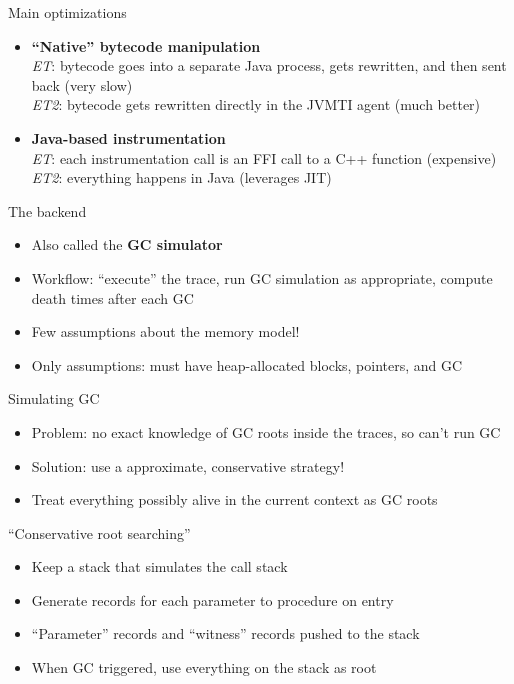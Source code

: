 \documentclass[11pt]{beamer}
\begin{document}
\begin{frame}{Main optimizations}
  \begin{itemize}
  \item \textbf{``Native'' bytecode manipulation}\\
    \textit{ET}: bytecode goes into a separate Java process, gets rewritten, and 
    then sent back (very slow)\\
    \textit{ET2}: bytecode gets rewritten directly in the JVMTI agent (much better)
    
    \pause
    
  \item \textbf{Java-based instrumentation}\\
    \textit{ET}: each instrumentation call is an FFI call to a C++ function (expensive)\\
    \textit{ET2}: everything happens in Java (leverages JIT)
  \end{itemize}
\end{frame}

\begin{frame}{The backend}
  \begin{itemize}
  \item Also called the \textbf{GC simulator}
  \item Workflow: ``execute'' the trace, run GC simulation as appropriate, compute death times after each GC
    \pause
  \item Few assumptions about the memory model!
    \pause
  \item Only assumptions: must have heap-allocated blocks, pointers, and GC
  \end{itemize}
\end{frame}

\begin{frame}{Simulating GC}
  \begin{itemize}
  \item Problem: no exact knowledge of GC roots inside the traces, so can't run GC
    \pause
  \item Solution: use a approximate, conservative strategy!
    \pause
  \item Treat everything possibly alive in the current context as GC roots
  \end{itemize}
\end{frame}

\begin{frame}{``Conservative root searching''}
  \begin{itemize}
  \item Keep a stack that simulates the call stack
    \pause
  \item Generate records for each parameter to procedure on entry
    \pause
  \item ``Parameter'' records and ``witness'' records pushed to the stack
    \pause
  \item When GC triggered, use everything on the stack as root
  \end{itemize}
\end{frame}
\end{document}

